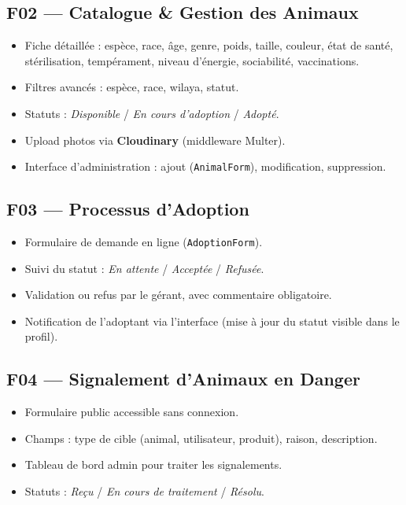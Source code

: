 \documentclass[12pt,a4paper]{report}
\begin{document}
\subsection{F02 --- Catalogue \& Gestion des Animaux}
\begin{itemize}[leftmargin=2em,itemsep=2pt]
  \item Fiche détaillée : espèce, race, âge, genre, poids, taille, couleur, état de santé, stérilisation, tempérament, niveau d'énergie, sociabilité, vaccinations.
  \item Filtres avancés : espèce, race, wilaya, statut.
  \item Statuts : \textit{Disponible} / \textit{En cours d'adoption} / \textit{Adopté}.
  \item Upload photos via \textbf{Cloudinary} (middleware Multer).
  \item Interface d'administration : ajout (\texttt{AnimalForm}), modification, suppression.
\end{itemize}

\subsection{F03 --- Processus d'Adoption}
\begin{itemize}[leftmargin=2em,itemsep=2pt]
  \item Formulaire de demande en ligne (\texttt{AdoptionForm}).
  \item Suivi du statut : \textit{En attente} / \textit{Acceptée} / \textit{Refusée}.
  \item Validation ou refus par le gérant, avec commentaire obligatoire.
  \item Notification de l'adoptant via l'interface (mise à jour du statut visible dans le profil).
\end{itemize}

\subsection{F04 --- Signalement d'Animaux en Danger}
\begin{itemize}[leftmargin=2em,itemsep=2pt]
  \item Formulaire public accessible sans connexion.
  \item Champs : type de cible (animal, utilisateur, produit), raison, description.
  \item Tableau de bord admin pour traiter les signalements.
  \item Statuts : \textit{Reçu} / \textit{En cours de traitement} / \textit{Résolu}.
\end{itemize}
\end{document}
